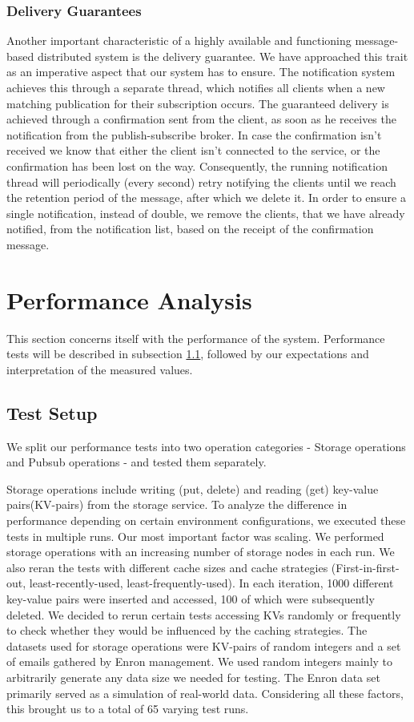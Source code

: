 \documentclass[sigconf]{acmart}
\begin{document}
\subsubsection{Delivery Guarantees}
Another important characteristic of a highly available and functioning message-based distributed system is the delivery guarantee. We have approached this trait as an imperative aspect that our system has to ensure. The notification system achieves this through a separate thread, which notifies all clients when a new matching publication for their subscription occurs. The guaranteed delivery is achieved through a confirmation sent from the client, as soon as he receives the notification from the publish-subscribe broker. In case the confirmation isn’t received we know that either the client isn’t connected to the service, or the confirmation has been lost on the way. Consequently, the running notification thread will periodically (every second) retry notifying the clients until we reach the retention period of the message, after which we delete it. In order to ensure a single notification, instead of double, we remove the clients, that we have already notified, from the notification list, based on the receipt of the confirmation message.

\section{Performance Analysis}\label{performance-analysis}
This section concerns itself with the performance of the system. Performance tests will be described in subsection \ref{test-setup}, followed by our expectations and interpretation of the measured values.

\subsection{Test Setup}\label{test-setup}
We split our performance tests into two operation categories - Storage operations and Pubsub operations - and tested them separately.

Storage operations include writing (put, delete) and reading (get) key-value pairs(KV-pairs)  from the storage service. To analyze the difference in performance depending on certain environment configurations, we executed these tests in multiple runs. Our most important factor was scaling. We performed storage operations with an increasing number of storage nodes in each run. We also reran the tests with different cache sizes and cache strategies (First-in-first-out, least-recently-used, least-frequently-used). In each iteration, 1000 different key-value pairs were inserted and accessed, 100 of which were subsequently deleted. We decided to rerun certain tests accessing KVs randomly or frequently to check whether they would be influenced by the caching strategies.
The datasets used for storage operations were KV-pairs of random integers and a set of emails gathered by Enron management. We used random integers mainly to arbitrarily generate any data size we needed for testing. The Enron data set primarily served as a simulation of real-world data. Considering all these factors, this brought us to a total of 65 varying test runs.
\end{document}
